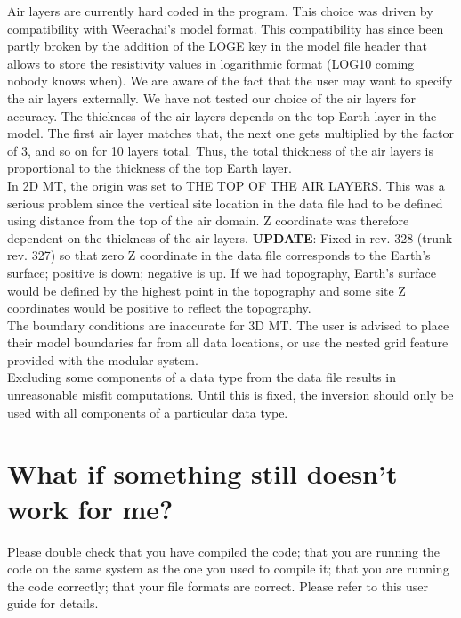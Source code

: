 \documentclass[12pt]{article}
\begin{document}
Air layers are currently hard coded in the program. This choice was driven by compatibility with Weerachai's model format. This compatibility has since been partly broken by the addition of the LOGE key in the model file header that allows to store the resistivity values in logarithmic format (LOG10 coming nobody knows when). We are aware of the fact that the user may want to specify the air layers externally. We have not tested our choice of the air layers for accuracy. The thickness of the air layers depends on the top Earth layer in the model. The first air layer matches that, the next one gets multiplied by the factor of 3, and so on for 10 layers total. Thus, the total thickness of the air layers is proportional to the thickness of the top Earth layer.\\

In 2D MT, the origin was set to THE TOP OF THE AIR LAYERS. This was a serious problem since the vertical site location in the data file had to be defined using distance from the top of the air domain. Z coordinate was therefore dependent on the thickness of the air layers. \textbf{UPDATE}: Fixed in rev. 328 (trunk rev. 327) so that zero Z coordinate in the data file corresponds to the Earth's surface; positive is down; negative is up. If we had topography, Earth's surface would be defined by the highest point in the topography and some site Z coordinates would be positive to reflect the topography.\\

The boundary conditions are inaccurate for 3D MT. The user is advised to place their model boundaries far from all data locations, or use the nested grid feature provided with the modular system.\\

Excluding some components of a data type from the data file results in unreasonable misfit computations. Until this is fixed, the inversion should only be used with all components of a particular data type.\\


\section{What if something still doesn't work for me?}

Please double check that you have compiled the code; that you are running the code on the same system as the one you used to compile it; that you are running the code correctly; that your file formats are correct. Please refer to this user guide for details.\\
\end{document}
